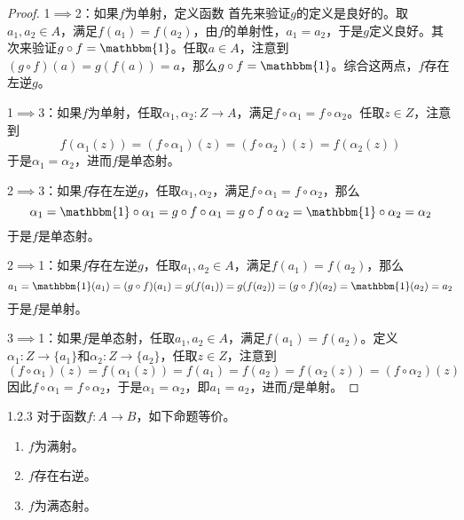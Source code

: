 \begin{proof}
	1$\implies$2：如果$f$为单射，定义函数
	首先来验证$g$的定义是良好的。取$a_1,a_2\in A$，满足$f(a_1)=f(a_2)$，由$f$的单射性，$a_1=a_2$，于是$g$定义良好。其次来验证$g\circ f=\mathbbm{1}$。任取$a\in A$，注意到$(g\circ f)(a)=g(f(a))=a$，那么$g\circ f=\mathbbm{1}$。综合这两点，$f$存在左逆$g$。
	
	1$\implies$3：如果$f$为单射，任取$\alpha_1,\alpha_2:Z\to A$，满足$f\circ \alpha_1=f\circ \alpha_2$。任取$z\in Z$，注意到
	$$
	f(\alpha_1(z))=(f\circ \alpha_1)(z)=(f\circ \alpha_2)(z)=f(\alpha_2(z))
	$$
	于是$\alpha_1=\alpha_2$，进而$f$是单态射。
	
	2$\implies $3：如果$f$存在左逆$g$，任取$\alpha_1,\alpha_2$，满足$f\circ \alpha_1=f\circ \alpha_2$，那么
	$$
	\alpha_1=\mathbbm{1}\circ \alpha_1=g\circ f\circ \alpha_1=g\circ f\circ \alpha_2=\mathbbm{1}\circ \alpha_2=\alpha_2
	$$
	于是$f$是单态射。
	
	2$\implies $1：如果$f$存在左逆$g$，任取$a_1,a_2\in A$，满足$f(a_1)=f(a_2)$，那么
	$$
	a_1=\mathbbm{1}(a_1)=(g\circ f)(a_1)=g(f(a_1))=g(f(a_2))=(g\circ f)(a_2)=\mathbbm{1}(a_2)=a_2
	$$
	于是$f$是单射。
	
	3$\implies$1：如果$f$是单态射，任取$a_1,a_2\in A$，满足$f(a_1)=f(a_2)$。定义$\alpha_1:Z\to \{a_1\}$和$\alpha_2:Z\to \{a_2\}$，任取$z\in Z$，注意到
	$$
	(f\circ \alpha_1)(z)=f(\alpha_1(z))=f(a_1)=f(a_2)=f(\alpha_2(z))=(f\circ \alpha_2)(z)
	$$
	因此$f\circ\alpha_1=f\circ\alpha_2$，于是$\alpha_1=\alpha_2$，即$a_1=a_2$，进而$f$是单射。
\end{proof}

\begin{theorem}{}{1.2.3}
	对于函数$f:A\to B$，如下命题等价。
	\begin{enumerate}
		\item $f$为满射。
		\item $f$存在右逆。
		\item $f$为满态射。
	\end{enumerate}
\end{theorem}

